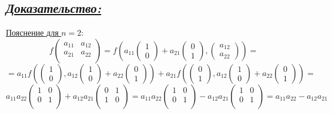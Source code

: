 \documentclass{article}
\begin{document}
\subsection*{\Large \underline{\textit{Доказательство: }}}
\underline{Пояснение для $n = 2$}:
$$
f\begin{pmatrix}
a_{11} & a_{12} \\ 
a_{21} & a_{22} \\
\end{pmatrix}
=
f \left(
a_{11} \begin{pmatrix} 1 \\ 0 \end{pmatrix}
+ a_{21} \begin{pmatrix} 0 \\ 1 \end{pmatrix},
\begin{pmatrix} a_{12} \\ a_{22} \end{pmatrix}
\right)
=
$$
$$
=
a_{11}f\left(
\begin{pmatrix} 1 \\ 0 \end{pmatrix},
a_{12} \begin{pmatrix} 1 \\ 0 \end{pmatrix} + 
a_{22} \begin{pmatrix} 0 \\ 1 \end{pmatrix}
\right) + 
a_{21}f\left(
\begin{pmatrix} 0 \\ 1 \end{pmatrix},
a_{12} \begin{pmatrix} 1 \\ 0 \end{pmatrix} + 
a_{22} \begin{pmatrix} 0 \\ 1 \end{pmatrix}
\right)
=
$$
$$
a_{11}a_{22}\begin{pmatrix}
1 & 0 \\
0 & 1 \\
\end{pmatrix}
+ a_{12}a_{21}
\begin{pmatrix}
0 & 1 \\
1 & 0 \\
\end{pmatrix}
=
a_{11}a_{22}\begin{pmatrix}
1 & 0 \\
0 & 1 \\
\end{pmatrix}
- a_{12}a_{21}
\begin{pmatrix}
1 & 0 \\
0 & 1 \\
\end{pmatrix}
= a_{11}a_{22} - a_{12}a_{21}
$$
\end{document}
